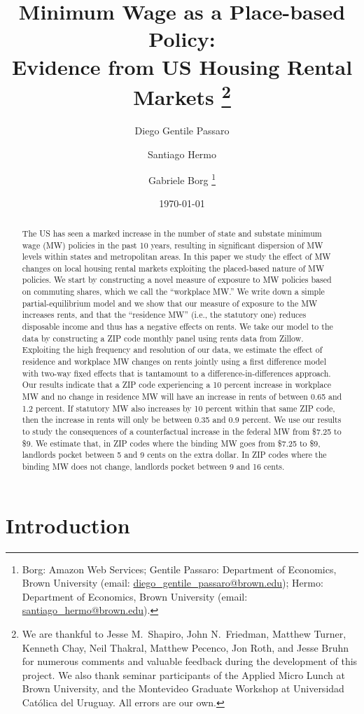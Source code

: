 \documentclass{article}
\title{ Minimum Wage as a Place-based Policy: \\
        Evidence from US Housing Rental Markets
        \thanks{We are thankful to Jesse M.\ Shapiro, John N.\ Friedman, Matthew Turner, 
        Kenneth Chay, Neil Thakral, Matthew Pecenco, Jon Roth, and Jesse Bruhn for numerous 
        comments and valuable feedback during the development of this project.
        We also thank seminar participants of the Applied Micro Lunch at Brown
        University, and the Montevideo Graduate Workshop at Universidad Católica del
        Uruguay.
        All errors are our own.}}
\author{Diego Gentile Passaro \and Santiago Hermo \and Gabriele Borg
        \footnote{
        Borg: Amazon Web Services; 
        Gentile Passaro: Department of Economics, Brown University 
        (email: \url{diego_gentile_passaro@brown.edu}); 
        Hermo: Department of Economics, Brown University 
        (email: \url{santiago_hermo@brown.edu}).}}
\date{\today}
\begin{document}
\maketitle

\begin{abstract}
    \noindent
    The US has seen a marked increase in the number of state and substate minimum 
    wage (MW) policies in the past 10 years, resulting in significant dispersion 
    of MW levels within states and metropolitan areas.
    In this paper we study the effect of MW changes on local housing rental 
    markets exploiting the placed-based nature of MW policies.
    We start by constructing a novel measure of exposure to MW policies based on 
    commuting shares, which we call the ``workplace MW.''
    We write down a simple partial-equilibrium model and we show that our measure of 
    exposure to the MW increases rents, and that the ``residence MW'' 
    (i.e., the statutory one) reduces disposable income and thus has a negative effects on rents.
    We take our model to the data by constructing a ZIP code monthly panel using 
    rents data from Zillow.
    Exploiting the high frequency and resolution of our data, we estimate the 
    effect of residence and workplace MW changes on rents jointly 
    using a first difference model with two-way fixed effects that is tantamount
    to a difference-in-differences approach.
    Our results indicate that a ZIP code experiencing a 10 percent increase in 
    workplace MW and no change in residence MW will have an increase in rents of 
    between 0.65 and 1.2 percent. If statutory MW also increases by 10 percent 
    within that same ZIP code, then the increase in rents will only be between 
    0.35 and 0.9 percent.
    We use our results to study the consequences of a counterfactual
    increase in the federal MW from \$7.25 to \$9.
    We estimate that, in ZIP codes where the binding MW goes from \$7.25 to \$9,
    landlords pocket between 5 and 9 cents on the extra dollar. In ZIP codes 
    where the binding MW does not change, landlords pocket between 9 and 16 cents.
\end{abstract}

\vspace{5mm}


\clearpage

\section{Introduction}\label{sec:intro}
    
\end{document}
